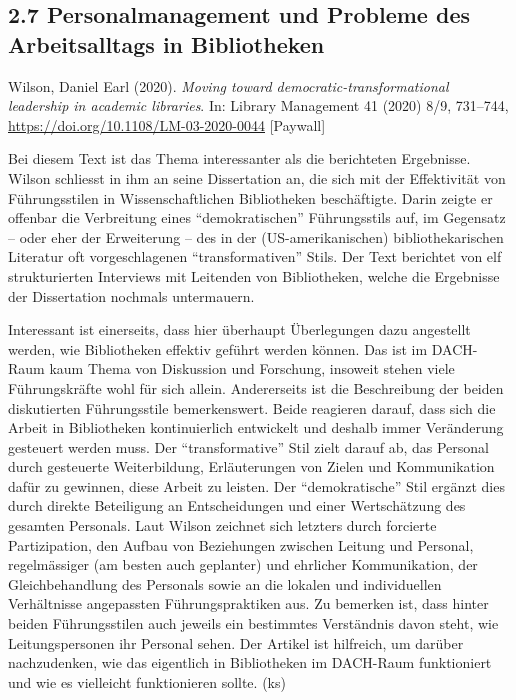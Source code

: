 \documentclass[a4paper,
fontsize=11pt,
oneside,
numbers=noperiodatend,
parskip=half-,
bibliography=totoc,
final
]{scrartcl}
\begin{document}
\hypertarget{personalmanagement-und-probleme-des-arbeitsalltags-in-bibliotheken}{%
\subsection{2.7 Personalmanagement und Probleme des Arbeitsalltags in
Bibliotheken}\label{personalmanagement-und-probleme-des-arbeitsalltags-in-bibliotheken}}

Wilson, Daniel Earl (2020). \emph{Moving toward
democratic-transformational leadership in academic libraries}. In:
Library Management 41 (2020) 8/9, 731--744,
\url{https://doi.org/10.1108/LM-03-2020-0044} {[}Paywall{]}

Bei diesem Text ist das Thema interessanter als die berichteten
Ergebnisse. Wilson schliesst in ihm an seine Dissertation an, die sich
mit der Effektivität von Führungsstilen in Wissenschaftlichen
Bibliotheken beschäftigte. Darin zeigte er offenbar die Verbreitung
eines \enquote{demokratischen} Führungsstils auf, im Gegensatz -- oder
eher der Erweiterung -- des in der (US-amerikanischen)
bibliothekarischen Literatur oft vorgeschlagenen
\enquote{transformativen} Stils. Der Text berichtet von elf
strukturierten Interviews mit Leitenden von Bibliotheken, welche die
Ergebnisse der Dissertation nochmals untermauern.

Interessant ist einerseits, dass hier überhaupt Überlegungen dazu
angestellt werden, wie Bibliotheken effektiv geführt werden können. Das
ist im DACH-Raum kaum Thema von Diskussion und Forschung, insoweit
stehen viele Führungskräfte wohl für sich allein. Andererseits ist die
Beschreibung der beiden diskutierten Führungsstile bemerkenswert. Beide
reagieren darauf, dass sich die Arbeit in Bibliotheken kontinuierlich
entwickelt und deshalb immer Veränderung gesteuert werden muss. Der
\enquote{transformative} Stil zielt darauf ab, das Personal durch
gesteuerte Weiterbildung, Erläuterungen von Zielen und Kommunikation
dafür zu gewinnen, diese Arbeit zu leisten. Der \enquote{demokratische}
Stil ergänzt dies durch direkte Beteiligung an Entscheidungen und einer
Wertschätzung des gesamten Personals. Laut Wilson zeichnet sich letzters
durch forcierte Partizipation, den Aufbau von Beziehungen zwischen
Leitung und Personal, regelmässiger (am besten auch geplanter) und
ehrlicher Kommunikation, der Gleichbehandlung des Personals sowie an die
lokalen und individuellen Verhältnisse angepassten Führungspraktiken
aus. Zu bemerken ist, dass hinter beiden Führungsstilen auch jeweils ein
bestimmtes Verständnis davon steht, wie Leitungspersonen ihr Personal
sehen. Der Artikel ist hilfreich, um darüber nachzudenken, wie das
eigentlich in Bibliotheken im DACH-Raum funktioniert und wie es
vielleicht funktionieren sollte. (ks)
\end{document}
